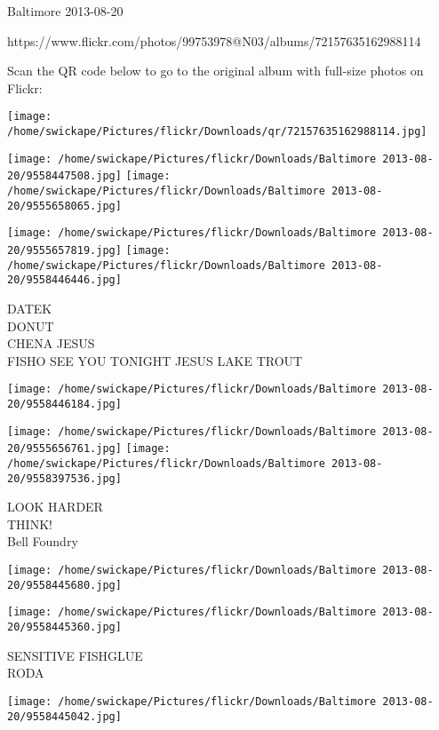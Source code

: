 \documentclass[10pt,letterpaper]{article}
\begin{document}
Baltimore 2013-08-20

https://www.flickr.com/photos/99753978@N03/albums/72157635162988114

Scan the QR code below to go to the original album with full-size photos on Flickr:

\texttt{[image: /home/swickape/Pictures/flickr/Downloads/qr/72157635162988114.jpg]}
\pagebreak

\texttt{[image: /home/swickape/Pictures/flickr/Downloads/Baltimore 2013-08-20/9558447508.jpg]}
\texttt{[image: /home/swickape/Pictures/flickr/Downloads/Baltimore 2013-08-20/9555658065.jpg]}

\texttt{[image: /home/swickape/Pictures/flickr/Downloads/Baltimore 2013-08-20/9555657819.jpg]}
\texttt{[image: /home/swickape/Pictures/flickr/Downloads/Baltimore 2013-08-20/9558446446.jpg]}

DATEK\\
DONUT\\
CHENA JESUS\\
FISHO SEE YOU TONIGHT JESUS LAKE TROUT\\
\pagebreak

\texttt{[image: /home/swickape/Pictures/flickr/Downloads/Baltimore 2013-08-20/9558446184.jpg]}

\vspace{0.25in}
\texttt{[image: /home/swickape/Pictures/flickr/Downloads/Baltimore 2013-08-20/9555656761.jpg]}
\texttt{[image: /home/swickape/Pictures/flickr/Downloads/Baltimore 2013-08-20/9558397536.jpg]}

LOOK HARDER\\
THINK!\\
Bell Foundry\\
\pagebreak

\texttt{[image: /home/swickape/Pictures/flickr/Downloads/Baltimore 2013-08-20/9558445680.jpg]}

\vspace{0.25in}
\texttt{[image: /home/swickape/Pictures/flickr/Downloads/Baltimore 2013-08-20/9558445360.jpg]}

SENSITIVE FISHGLUE\\
RODA\\
\pagebreak

\texttt{[image: /home/swickape/Pictures/flickr/Downloads/Baltimore 2013-08-20/9558445042.jpg]}
\end{document}
